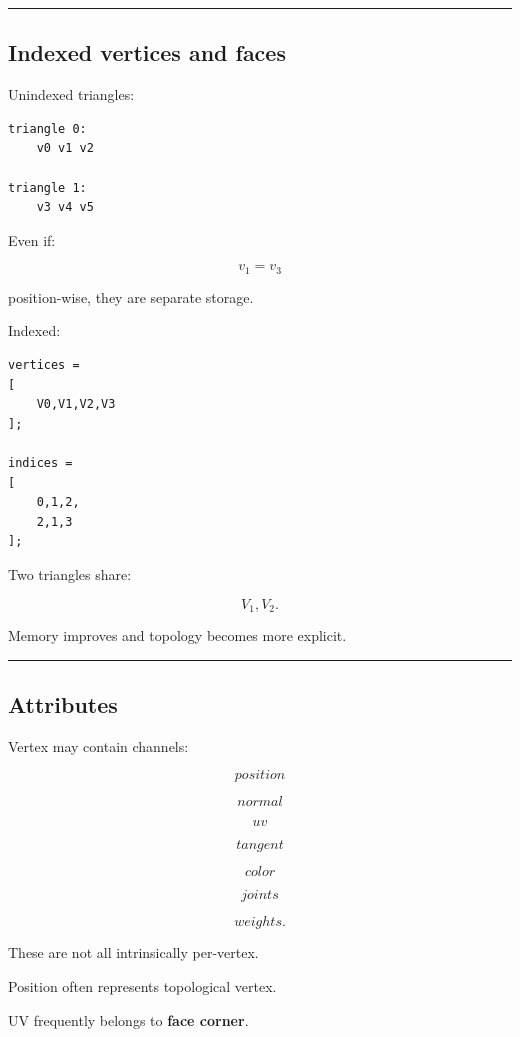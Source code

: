 \begin{center}\rule{0.5\linewidth}{0.5pt}\end{center}

\subsection{Indexed vertices and faces}\label{04-visual-computing-ii-ch040-indexed-vertices-and-faces}

Unindexed triangles:

\begin{verbatim}
triangle 0:
    v0 v1 v2

triangle 1:
    v3 v4 v5
\end{verbatim}

Even if:

\[
v_1=v_3
\]

position-wise, they are separate storage.

Indexed:

\begin{verbatim}
vertices =
[
    V0,V1,V2,V3
];

indices =
[
    0,1,2,
    2,1,3
];
\end{verbatim}

Two triangles share:

\[
V_1,V_2.
\]

Memory improves and topology becomes more explicit.

\begin{center}\rule{0.5\linewidth}{0.5pt}\end{center}

\subsection{Attributes}\label{04-visual-computing-ii-ch040-attributes}

Vertex may contain channels:

\[
position
\]

\[
normal
\]

\[
uv
\]

\[
tangent
\]

\[
color
\]

\[
joints
\]

\[
weights.
\]

These are not all intrinsically per-vertex.

Position often represents topological vertex.

UV frequently belongs to \textbf{face corner}.


